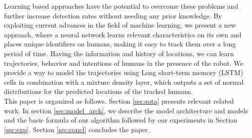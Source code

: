 Learning based approaches have the potential to overcome these problems and further increase detection rates without needing any prior knowledge.
By exploiting current advances in the field of machine learning, we present a new approach, where a neural network learns relevant characteristics on its own and places unique identifiers on humans, making it easy to track them over a long period of time.
Having the information and history of locations, we can learn trajectories, behavior and intentions of humans in the presence of the robot. 
We provide a way to model the trajectories using Long short-term memory (LSTM) cells in combination with a mixture density layer, which outputs a set of normal distributions for the predicted locations of the tracked humans.\\
This paper is organized as follows.
Section \ref{sec:sota} presents relevant related work.
In section \ref{sec:model_arch}, we describe the model architecture and models and the basic formula of our algorithm followed by our experiments in Section \ref{sec:exp}.
Section \ref{sec:concl} concludes the paper.

